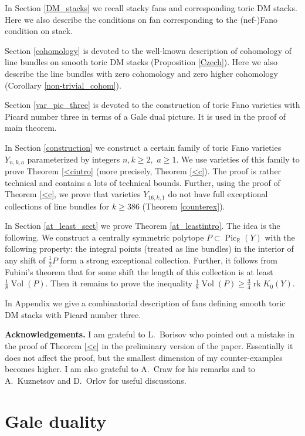 \documentclass[11pt,leqno]{amsart}
\numberwithin{equation}{section}
\def\R{\mathbb{R}}
\newcommand{\Vol}{\operatorname{Vol}}
\newcommand{\Pic}{\operatorname{Pic}}
\newcommand{\rk}{\operatorname{rk}}
\begin{document}
In Section \ref{DM_stacks} we recall stacky fans and corresponding toric DM stacks.
Here we also describe the conditions on fan corresponding to the (nef-)Fano condition on stack.

Section \ref{cohomology} is devoted to the well-known description of cohomology of line bundles on smooth toric DM stacks (Proposition \ref{Czech}).
Here we also describe the line bundles with zero cohomology and zero higher cohomology (Corollary \ref{non-trivial_cohom}).

Section \ref{var_pic_three} is devoted to the construction of toric Fano varieties with Picard number three in terms of a Gale dual picture.
It is used in the proof of main theorem.

In Section \ref{construction} we construct a certain family of toric Fano varieties $Y_{n,k,a}$ parameterized by integers $n,k\geq 2,$ $a\geq 1.$
We use varieties of this family to prove Theorem \ref{<cintro} (more precisely, Theorem \ref{<c}). The proof is rather technical and
contains a lots of technical bounds. Further, using the proof of Theorem \ref{<c},
we prove that varieties $Y_{16,k,1}$ do not have full exceptional collections of line bundles for $k\geq 386$ (Theorem \ref{counterex}).

In Section \ref{at_least_sect} we prove Theorem \ref{at_leastintro}. The idea is the following. We construct a centrally symmetric polytope $P\subset \Pic_{\R}(Y)$
with the following property: the integral points (treated as line bundles) in the interior of any shift of $\frac12 P$ form a strong exceptional collection.
Further, it follows from Fubini's theorem that for some shift the length of this collection is at least $\frac18\Vol(P).$ Then it remains to prove
the inequality $\frac18\Vol(P)\geq \frac34\rk K_0(Y).$

In Appendix we give a combinatorial description of fans defining smooth toric DM stacks with Picard number three.

{\bf Acknowledgements.} I am grateful to L.~Borisov who pointed out a mistake in the proof of Theorem \ref{<c} in the preliminary version of the paper.
Essentially it does not affect the proof, but the smallest dimension of my counter-examples becomes higher.
I am also grateful to A.~Craw for his remarks and to A.~Kuznetsov and D.~Orlov for useful discussions.

\section{Gale duality}
\label{Gale}
\end{document}
